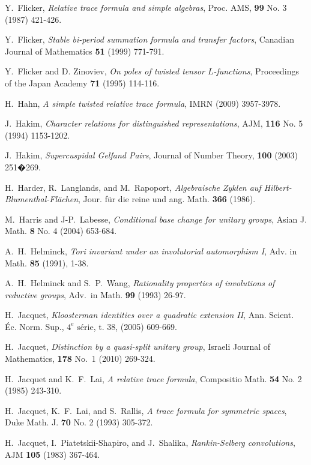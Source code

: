 \documentclass[12pt]{amsart}
\theoremstyle{remark}
\numberwithin{equation}{section}
\theoremstyle{definition}
\numberwithin{equation}{subsection}
\begin{document}
\begin{thebibliography}{}
 Y.~Flicker, \emph{Relative trace formula
and simple algebras}, Proc. AMS, {\bf 99} No. 3 (1987) 421-426.

 Y.~Flicker, \emph{Stable bi-period summation formula and transfer factors},
Canadian Journal of Mathematics {\bf 51} (1999)
771-791.

 Y.~Flicker and D. Zinoviev, \emph{On poles of twisted tensor $L$-functions},
Proceedings of the Japan Academy {\bf 71} (1995) 114-116.

 H.~Hahn, \emph{A simple twisted relative trace formula}, IMRN  (2009) 3957-3978.

 J.~Hakim, \emph{Character relations for distinguished representations},
AJM, {\bf 116} No. 5 (1994) 1153-1202.

 J.~Hakim, \emph{Supercuspidal Gelfand Pairs}, Journal of Number Theory, {\bf 100} (2003) 251�269.

 H.~Harder, R.~Langlands, and M.~Rapoport, \emph{Algebraische Zyklen
auf Hilbert-Blumenthal-Fl\"achen}, Jour. f\"ur die reine und ang. Math. {\bf 366} (1986).

 M.~Harris and J-P.~Labesse,
\emph{Conditional base change for unitary groups}, Asian J. Math. {\bf 8} No. 4 (2004) 653-684.

 A.~H.~Helminck, \emph{Tori invariant under an involutorial automorphism I}, Adv. in Math. {\bf 85} (1991), 1-38.

 A.~H.~Helminck and S.~P.~Wang, \emph{Rationality properties
of involutions of reductive groups}, Adv.~in Math. {\bf 99}
(1993) 26-97.

 H.~Jacquet, \emph{Kloosterman identities over a quadratic extension II},
Ann. Scient. \'Ec. Norm. Sup., $4^e$ s\'erie, t. 38, (2005) 609-669.

 H.~Jacquet, \emph{Distinction by a quasi-split unitary group}, Israeli Journal of Mathematics, {\bf 178} No.~1 (2010) 269-324.

 H.~Jacquet and K.~F.~Lai, \emph{A relative
trace formula}, Compositio Math. {\bf 54} No. 2 (1985) 243-310.

 H.~Jacquet, K.~F.~Lai, and S.~Rallis, \emph{A trace formula
for symmetric spaces}, Duke Math. J. { \bf 70} No. 2 (1993) 305-372.

 H.~Jacquet, I.~Piatetskii-Shapiro, and J.~Shalika, \emph{Rankin-Selberg convolutions}, AJM {\bf 105} (1983) 367-464.


\end{thebibliography}
\end{document}
